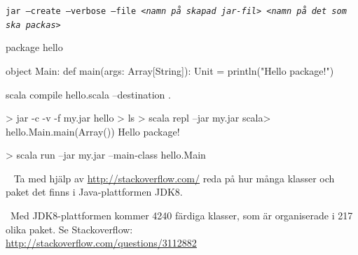 \TaskSolved \what

\SubtaskSolved

\texttt{jar --create --verbose --file \textit{<namn på skapad jar-fil> <namn på det som ska packas>}}

\SubtaskSolved
\begin{Code}
package hello

object Main:
  def main(args: Array[String]): Unit = println("Hello package!")
\end{Code}

\begin{REPLnonum}
scala compile hello.scala --destination .
\end{REPLnonum}

\SubtaskSolved
\begin{REPL}
> jar -c -v -f my.jar hello
> ls
> scala repl --jar my.jar
scala> hello.Main.main(Array())
Hello package!
\end{REPL}

\SubtaskSolved
\begin{REPL}
> scala run --jar my.jar  --main-class hello.Main
\end{REPL}

\QUESTEND





\QUESTBEGIN

\Task\Uberkurs \what~ Ta med hjälp av \url{http://stackoverflow.com/} reda på hur många klasser och paket det finns i Java-plattformen JDK8.

\SOLUTION

\TaskSolved \what~Med JDK8-plattformen kommer 4240 färdiga klasser, som är organiserade i 217 olika paket. Se Stackoverflow: \\\url{http://stackoverflow.com/questions/3112882}

\QUESTEND
